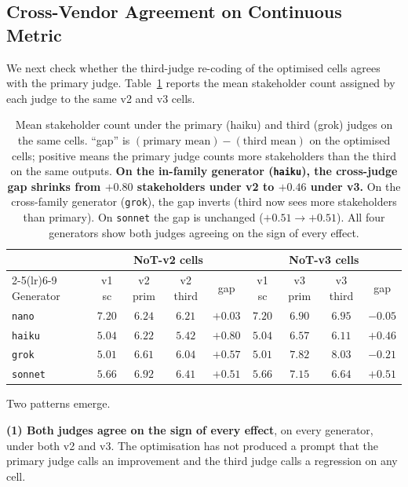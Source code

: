 \documentclass[11pt]{article}
\begin{document}
\subsection{Cross-Vendor Agreement on Continuous Metric}
\label{sec:cross_vendor}

We next check whether the third-judge re-coding of the optimised cells agrees with the primary judge.
Table~\ref{tab:cross_means} reports the mean stakeholder count assigned by each judge to the same v2 and v3 cells.

\begin{table}[t]
\centering\small
\begin{tabular}{lcccccccc}
\toprule
& \multicolumn{4}{c}{\textbf{NoT-v2 cells}} & \multicolumn{4}{c}{\textbf{NoT-v3 cells}} \\
\cmidrule(lr){2-5}\cmidrule(lr){6-9}
Generator & v1 sc & v2 prim & v2 third & gap & v1 sc & v3 prim & v3 third & gap \\
\midrule
\texttt{nano}   & $7.20$ & $6.24$ & $6.21$ & $+0.03$ & $7.20$ & $6.90$ & $6.95$ & $-0.05$ \\
\texttt{haiku}  & $5.04$ & $6.22$ & $5.42$ & $+0.80$ & $5.04$ & $6.57$ & $6.11$ & $+0.46$ \\
\texttt{grok}   & $5.01$ & $6.61$ & $6.04$ & $+0.57$ & $5.01$ & $7.82$ & $8.03$ & $-0.21$ \\
\texttt{sonnet} & $5.66$ & $6.92$ & $6.41$ & $+0.51$ & $5.66$ & $7.15$ & $6.64$ & $+0.51$ \\
\bottomrule
\end{tabular}
\caption{Mean stakeholder count under the primary (haiku) and third (grok) judges on the same cells.
``gap'' is $(\text{primary mean}) - (\text{third mean})$ on the optimised cells; positive means the primary judge counts more stakeholders than the third on the same outputs.
\textbf{On the in-family generator (\texttt{haiku}), the cross-judge gap shrinks from $+0.80$ stakeholders under v2 to $+0.46$ under v3.}
On the cross-family generator (\texttt{grok}), the gap inverts (third now sees more stakeholders than primary).
On \texttt{sonnet} the gap is unchanged ($+0.51 \to +0.51$).
All four generators show both judges agreeing on the sign of every effect.}
\label{tab:cross_means}
\end{table}

Two patterns emerge.

\textbf{(1) Both judges agree on the sign of every effect}, on every generator, under both v2 and v3.
The optimisation has not produced a prompt that the primary judge calls an improvement and the third judge calls a regression on any cell.
\end{document}
